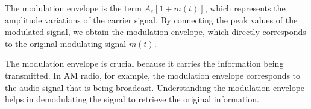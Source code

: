 The modulation envelope is the term \( A_c \left[1 + m(t)\right] \), which represents the amplitude variations of the carrier signal. By connecting the peak values of the modulated signal, we obtain the modulation envelope, which directly corresponds to the original modulating signal \( m(t) \).

The modulation envelope is crucial because it carries the information being transmitted. In AM radio, for example, the modulation envelope corresponds to the audio signal that is being broadcast. Understanding the modulation envelope helps in demodulating the signal to retrieve the original information.

